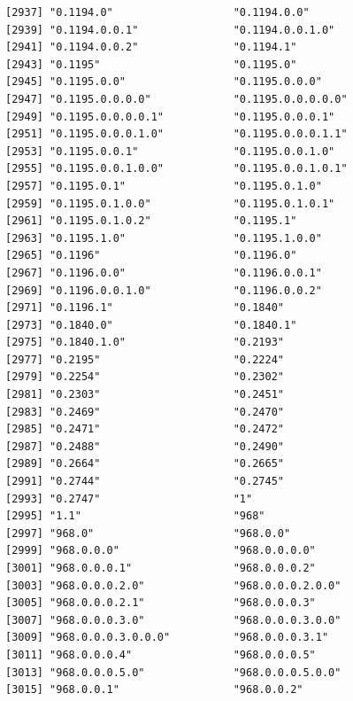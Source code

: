 \documentclass[
  letterpaper,
  DIV=11,
  numbers=noendperiod]{scrreprt}
\begin{document}
\begin{verbatim}
[2937] "0.1194.0"                   "0.1194.0.0"                
[2939] "0.1194.0.0.1"               "0.1194.0.0.1.0"            
[2941] "0.1194.0.0.2"               "0.1194.1"                  
[2943] "0.1195"                     "0.1195.0"                  
[2945] "0.1195.0.0"                 "0.1195.0.0.0"              
[2947] "0.1195.0.0.0.0"             "0.1195.0.0.0.0.0"          
[2949] "0.1195.0.0.0.0.1"           "0.1195.0.0.0.1"            
[2951] "0.1195.0.0.0.1.0"           "0.1195.0.0.0.1.1"          
[2953] "0.1195.0.0.1"               "0.1195.0.0.1.0"            
[2955] "0.1195.0.0.1.0.0"           "0.1195.0.0.1.0.1"          
[2957] "0.1195.0.1"                 "0.1195.0.1.0"              
[2959] "0.1195.0.1.0.0"             "0.1195.0.1.0.1"            
[2961] "0.1195.0.1.0.2"             "0.1195.1"                  
[2963] "0.1195.1.0"                 "0.1195.1.0.0"              
[2965] "0.1196"                     "0.1196.0"                  
[2967] "0.1196.0.0"                 "0.1196.0.0.1"              
[2969] "0.1196.0.0.1.0"             "0.1196.0.0.2"              
[2971] "0.1196.1"                   "0.1840"                    
[2973] "0.1840.0"                   "0.1840.1"                  
[2975] "0.1840.1.0"                 "0.2193"                    
[2977] "0.2195"                     "0.2224"                    
[2979] "0.2254"                     "0.2302"                    
[2981] "0.2303"                     "0.2451"                    
[2983] "0.2469"                     "0.2470"                    
[2985] "0.2471"                     "0.2472"                    
[2987] "0.2488"                     "0.2490"                    
[2989] "0.2664"                     "0.2665"                    
[2991] "0.2744"                     "0.2745"                    
[2993] "0.2747"                     "1"                         
[2995] "1.1"                        "968"                       
[2997] "968.0"                      "968.0.0"                   
[2999] "968.0.0.0"                  "968.0.0.0.0"               
[3001] "968.0.0.0.1"                "968.0.0.0.2"               
[3003] "968.0.0.0.2.0"              "968.0.0.0.2.0.0"           
[3005] "968.0.0.0.2.1"              "968.0.0.0.3"               
[3007] "968.0.0.0.3.0"              "968.0.0.0.3.0.0"           
[3009] "968.0.0.0.3.0.0.0"          "968.0.0.0.3.1"             
[3011] "968.0.0.0.4"                "968.0.0.0.5"               
[3013] "968.0.0.0.5.0"              "968.0.0.0.5.0.0"           
[3015] "968.0.0.1"                  "968.0.0.2"                 

\end{verbatim}
\end{document}
